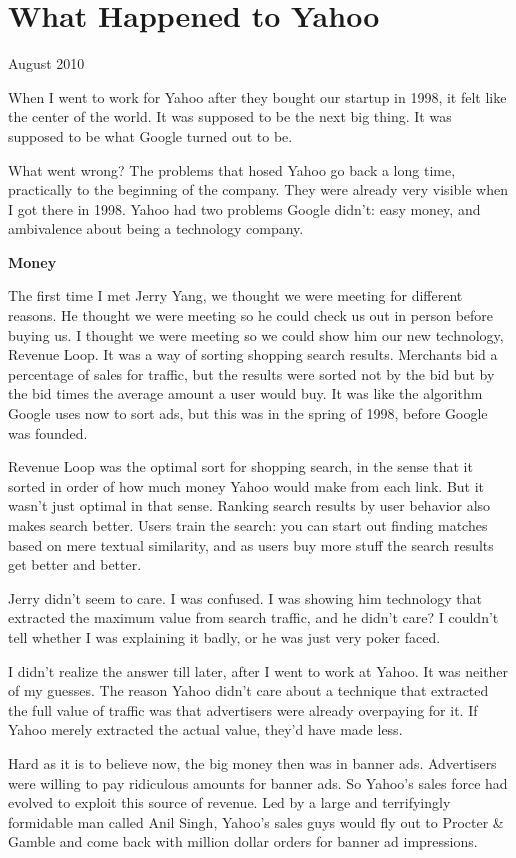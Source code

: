 \chapter{What Happened to Yahoo }

August 2010

When I went to work for Yahoo after they bought our startup in 1998, it
felt like the center of the world. It was supposed to be the next big
thing. It was supposed to be what Google turned out to be.

What went wrong? The problems that hosed Yahoo go back a long time,
practically to the beginning of the company. They were already very
visible when I got there in 1998. Yahoo had two problems Google didn't:
easy money, and ambivalence about being a technology company.

\textbf{Money}

The first time I met Jerry Yang, we thought we were meeting for
different reasons. He thought we were meeting so he could check us out
in person before buying us. I thought we were meeting so we could show
him our new technology, Revenue Loop. It was a way of sorting shopping
search results. Merchants bid a percentage of sales for traffic, but the
results were sorted not by the bid but by the bid times the average
amount a user would buy. It was like the algorithm Google uses now to
sort ads, but this was in the spring of 1998, before Google was founded.

Revenue Loop was the optimal sort for shopping search, in the sense that
it sorted in order of how much money Yahoo would make from each link.
But it wasn't just optimal in that sense. Ranking search results by user
behavior also makes search better. Users train the search: you can start
out finding matches based on mere textual similarity, and as users buy
more stuff the search results get better and better.

Jerry didn't seem to care. I was confused. I was showing him technology
that extracted the maximum value from search traffic, and he didn't
care? I couldn't tell whether I was explaining it badly, or he was just
very poker faced.

I didn't realize the answer till later, after I went to work at Yahoo.
It was neither of my guesses. The reason Yahoo didn't care about a
technique that extracted the full value of traffic was that advertisers
were already overpaying for it. If Yahoo merely extracted the actual
value, they'd have made less.

Hard as it is to believe now, the big money then was in banner ads.
Advertisers were willing to pay ridiculous amounts for banner ads. So
Yahoo's sales force had evolved to exploit this source of revenue. Led
by a large and terrifyingly formidable man called Anil Singh, Yahoo's
sales guys would fly out to Procter \& Gamble and come back with million
dollar orders for banner ad impressions.

